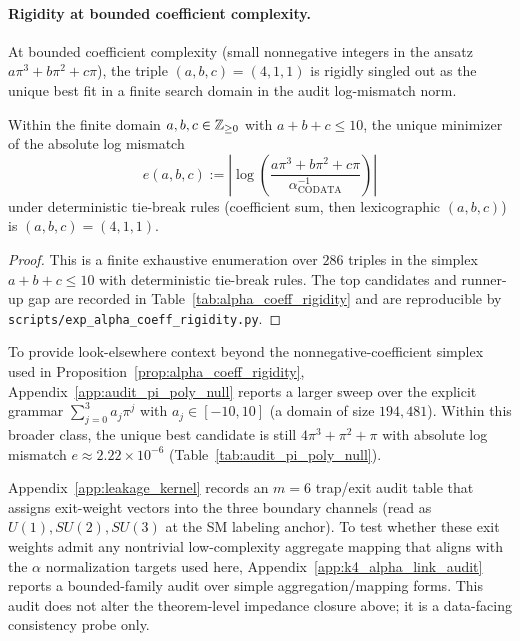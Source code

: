\paragraph{Rigidity at bounded coefficient complexity.}
At bounded coefficient complexity (small nonnegative integers in the ansatz $a\pi^3+b\pi^2+c\pi$), the triple $(a,b,c)=(4,1,1)$ is rigidly singled out as the unique best fit in a finite search domain in the audit log-mismatch norm.
\begin{proposition}\label{prop:alpha_coeff_rigidity}
Within the finite domain $a,b,c\in\mathbb{Z}_{\ge 0}$ with $a+b+c\le 10$, the unique minimizer of the absolute log mismatch
\[
e(a,b,c):=\left|\log\!\left(\frac{a\pi^3+b\pi^2+c\pi}{\alpha_{\mathrm{CODATA}}^{-1}}\right)\right|
\]
under deterministic tie-break rules (coefficient sum, then lexicographic $(a,b,c)$) is $(a,b,c)=(4,1,1)$.
\end{proposition}
\begin{proof}
This is a finite exhaustive enumeration over $286$ triples in the simplex $a+b+c\le 10$ with deterministic tie-break rules.
The top candidates and runner-up gap are recorded in Table~\ref{tab:alpha_coeff_rigidity} and are reproducible by \texttt{scripts/exp\_alpha\_coeff\_rigidity.py}.
\end{proof}

\begin{remark}\label{rem:alpha_pi_poly_null}
To provide look-elsewhere context beyond the nonnegative-coefficient simplex used in Proposition~\ref{prop:alpha_coeff_rigidity}, Appendix~\ref{app:audit_pi_poly_null} reports a larger sweep over the explicit grammar
$\sum_{j=0}^3 a_j\pi^j$ with $a_j\in[-10,10]$ (a domain of size $194{,}481$).
Within this broader class, the unique best candidate is still $4\pi^3+\pi^2+\pi$ with absolute log mismatch $e\approx 2.22\times 10^{-6}$ (Table~\ref{tab:audit_pi_poly_null}).
\end{remark}

\begin{remark}
\label{rem:k4_alpha_link_audit}
\AuditTag Appendix~\ref{app:leakage_kernel} records an $m=6$ trap/exit audit table that assigns exit-weight vectors into the three boundary channels (read as $U(1),SU(2),SU(3)$ at the SM labeling anchor).
To test whether these exit weights admit any nontrivial low-complexity aggregate mapping that aligns with the $\alpha$ normalization targets used here, Appendix~\ref{app:k4_alpha_link_audit} reports a bounded-family audit over simple aggregation/mapping forms.
This audit does not alter the theorem-level impedance closure above; it is a data-facing consistency probe only.
\end{remark}


